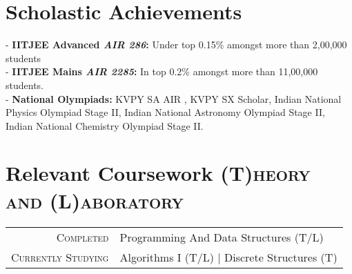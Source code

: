 \documentclass[a4paper,10pt]{extarticle} %
\begin{document}


\vspace{-0.4cm}
\section{\textcolor{primary}{Scholastic Achievements}}

- \textbf{IITJEE Advanced \emph{AIR 286}:} Under top 0.15\% amongst more than 2,00,000 students \\
- \textbf{IITJEE Mains \emph{AIR 2285}:} In top 0.2\% amongst more than 11,00,000 students. \\
- \textbf{National Olympiads:} KVPY SA AIR , KVPY SX Scholar, Indian National Physics Olympiad Stage II, Indian National Astronomy Olympiad Stage II, Indian National Chemistry Olympiad Stage II. \\


\vspace{-0.3cm}
\section{\textcolor{primary}{Relevant Coursework}
\hfill\small\textsc{(T)heory and (L)aboratory}}

\begin{tabular}{r|p{15cm}}
\textsc{Completed} & Programming And Data Structures (T/L)  \\
\textsc{Currently Studying} & Algorithms I (T/L) | Discrete Structures (T)
\end{tabular}

\end{document}
